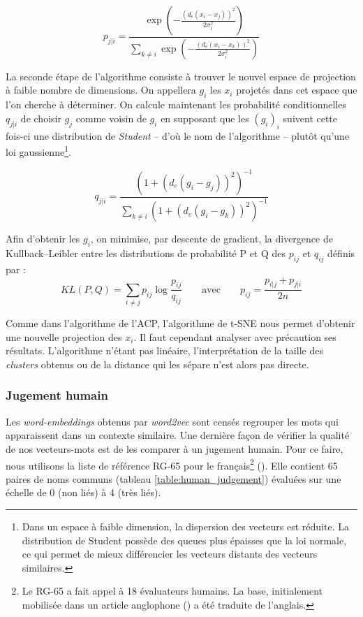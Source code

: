 \documentclass[11pt,french,french]{article}
\let\rmarkdownfootnote\footnote%
\def\footnote{\protect\rmarkdownfootnote}
\begin{document}
\[ p_{j|i} = \frac{
\exp\left(-\frac{(d_e(x_i - x_j))^2}{2\sigma_i^2}\right)
}{
\sum_{k \neq i}
\exp\left(-\frac{(d_e(x_i - x_k))^2}{2\sigma_i^2}\right)
}\]

La seconde étape de l'algorithme consiste à trouver le nouvel espace de projection à faible nombre de dimensions.
On appellera \(g_i\) les \(x_i\) projetés dans cet espace que l'on cherche à déterminer.
On calcule maintenant les probabilité conditionnelles \(q_{j|i}\) de choisir \(g_j\) comme voisin de \(g_i\) en supposant que les \((g_i)_i\) suivent cette fois-ci une distribution de \emph{Student} -- d'où le nom de l'algorithme -- plutôt qu'une loi gaussienne\footnote{Dans un espace à faible dimension, la dispersion des vecteurs est réduite.
  La distribution de Student possède des queues plus épaisses que la loi normale, ce qui permet de mieux différencier les vecteurs distants des vecteurs similaires.}.

\[ q_{j|i} = \frac{(1+ (d_e(g_i - g_j))^2)^{-1}}{\sum_{k \neq i}{(1+ (d_e(g_i - g_k))^2)^{-1}}}\]

Afin d'obtenir les \(g_i\), on minimise, par descente de gradient, la divergence de Kullback--Leibler entre les distributions de probabilité P et Q des \(p_{ij}\) et \(q_{ij}\) définis par :
\[KL(P,Q) = \sum_{i \neq j} { p_{ij} \log{\frac{p_{ij}}{q_{ij}}}} \qquad\text{avec}\qquad p_{ij} = \frac{p_{i|j} + p_{j|i}}{2n}\]

Comme dans l'algorithme de l'ACP, l'algorithme de t-SNE nous permet d'obtenir une nouvelle projection des \(x_i\).
Il faut cependant analyser avec précaution ses résultats. L'algorithme n'étant pas linéaire, l'interprétation de la taille des \emph{clusters} obtenus ou de la distance qui les sépare n'est alors pas directe.

\hypertarget{sec:jugementHumain}{%
\subsubsection{Jugement humain}\label{sec:jugementHumain}}

Les \emph{word-embeddings} obtenus par \emph{word2vec} sont censés regrouper les mots qui apparaissent dans un contexte similaire.
Une dernière façon de vérifier la qualité de nos vecteurs-mots est de les comparer à un jugement humain. Pour ce faire, nous utilisons la liste de référence RG-65 pour le français\footnote{Le RG-65 a fait appel à 18 évaluateurs humains. La base, initialement mobilisée dans un article anglophone (\cite{Rubenstein}) a été traduite de l'anglais.} (\cite{Boumedyen}).
Elle contient 65 paires de noms communs (tableau \ref{table:human_judgement}) évaluées sur une échelle de 0 (non liés) à 4 (très liés).
\end{document}
